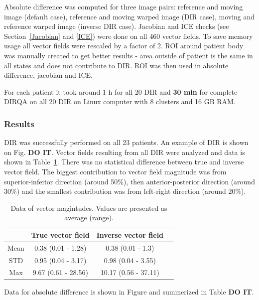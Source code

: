 \documentclass[type=dr, dr=rernat, accentcolor=tud7b,colorbacktitle, bigchapter, openright, twoside, 12pt ]{tudthesis}
\begin{document}
Absolute difference was computed for three image pairs: reference and moving image (default case), reference and moving warped image (DIR case), moving and reference warped image (inverse DIR case).
Jacobian and ICE checks (see Section~\ref{Jacobian} and \ref{ICE}) were done on all 460 vector fields. To save memory usage all vector fields were rescaled by a factor of 2. 
ROI around patient body was manually created to get better results - area outside of patient is the same in all states and does not contribute to DIR. ROI was then used in absolute difference, jacobian and ICE.

For each patient it took around 1 h for all 20 DIR and \textbf{30 min} for complete DIRQA on all 20 DIR  on Linux computer with 8 clusters and 16 GB RAM.


\subsubsection{Results}

DIR was successfully performed on all 23 patients. An example of DIR is shown on Fig. \textbf{DO IT}. Vector fields resulting from all DIR were analyzed and data is shown in Table~\ref{tab:vectordata_lung}. There was no statistical
difference between true and inverse vector field. The biggest contribution to vector field magnitude was from superior-inferior direction (around 50\%), then anterior-posterior direction (around 30\%) and the smallest contribution was from left-right direction (around 20\%).

\begin{table}[H]
  \centering
  \caption{Data of vector magintudes. Values are presented as average (range).}
  \begin{tabular}{c|c|c|c}
  
       & True vector field & Inverse vector field  \\
       \hline
       Mean & 0.38 (0.01 - 1.28) & 0.38 (0.01 - 1.3) \\ 
       STD & 0.95 (0.04 - 3.17) & 0.98 (0.04 - 3.55) \\ 
       Max & 9.67 (0.61 - 28.56) & 10.17 (0.56 - 37.11) \\
    \hline\hline
  \end{tabular}
  \label{tab:vectordata_lung}
\end{table}

Data for absolute difference is shown in Figure and summerized in Table \textbf{DO IT}.
\end{document}
